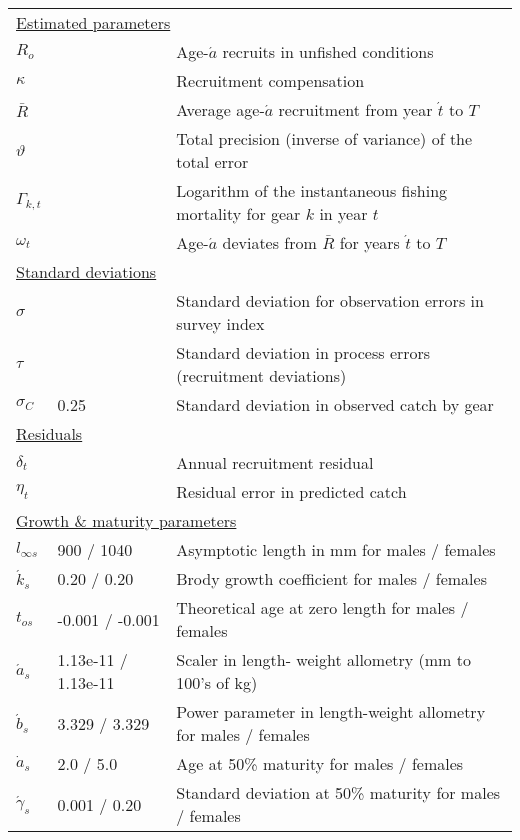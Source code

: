 \begin{table}[b]
\begin{tabular}{lll}
\multicolumn{3}{l}{\underline{Estimated parameters}}\\
$R_o$               & & Age-$\acute{a}$ recruits in unfished conditions\\
$\kappa$            & & Recruitment compensation\\
$\bar{R}$           & & Average age-$\acute{a}$ recruitment from year $\acute{t}$ to $T$\\
$\vartheta$         & & Total precision (inverse of variance) of the total error\\
$\Gamma_{k,t}$    & & Logarithm of the instantaneous fishing mortality for gear $k$ in year $t$\\
$\omega_t$          & & Age-$\acute{a}$ deviates from $\bar{R}$ for years $\acute{t}$ to $T$\\
\multicolumn{3}{l}{\underline{Standard deviations}}\\
$\sigma$            &       & Standard deviation for observation errors in survey index\\
$\tau$              &       & Standard deviation in process errors (recruitment deviations)\\
$\sigma_C$          &0.25 & Standard deviation in observed catch by gear\\
\multicolumn{3}{l}{\underline{Residuals}}\\
$\delta_t$      &   & Annual recruitment residual\\
$\eta_t$        &   & Residual error in predicted catch\\
\multicolumn{3}{l}{\underline{Growth \& maturity parameters}}\\
$l_{\infty  s}$ &  900 / 1040 &  Asymptotic length in mm for males / females \\
$\acute{k}_s$ & 0.20 / 0.20 & Brody growth coefficient for males / females \\
$t_{o s}$ & -0.001 / -0.001 & Theoretical age at zero length for males / females \\
$\acute{a}_s$ & 1.13e{-11} / 1.13e{-11} &  Scaler in length- weight allometry (mm to 100's of kg)\\
$\acute{b}_s$ & 3.329 / 3.329 &Power parameter in length-weight allometry for males / females\\
$\dot{a}_s$ & 2.0 / 5.0 & Age at 50\% maturity for males / females \\
$\acute{\gamma}_s$ & 0.001 / 0.20 & Standard deviation at 50\% maturity for males / females\\
\hline
\end{tabular}
\end{table}

